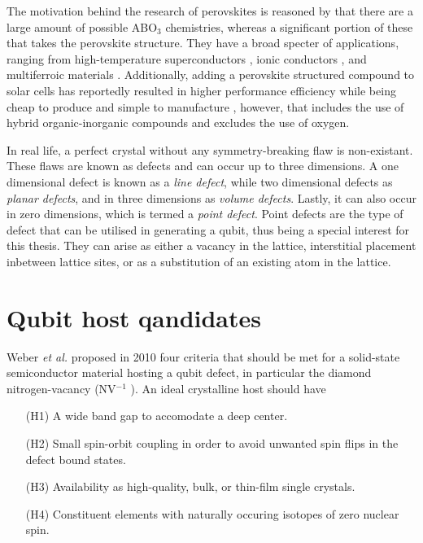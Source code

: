 The motivation behind the research of perovskites is reasoned by that there are a large amount of possible ABO$_3$ chemistries, whereas a significant portion of these that takes the perovskite structure. They have a broad specter of applications, ranging from high-temperature superconductors \cite{Bednorz1988}, ionic conductors \cite{Boivin1998}, and  multiferroic materials \cite{Cheong2007}. Additionally, adding a perovskite structured compound to solar cells has reportedly resulted in higher performance efficiency while being cheap to produce and simple to manufacture \cite{IbnMohammed2017, Chen2014}, however, that includes the use of hybrid organic-inorganic compounds and excludes the use of oxygen.

In real life, a perfect crystal without any symmetry-breaking flaw is non-existant. These flaws are known as defects and can occur up to three dimensions. A one dimensional defect is known as a \textit{line defect}, while two dimensional defects as \textit{planar defects}, and in three dimensions as \textit{volume defects}. Lastly, it can also occur in zero dimensions, which is termed a \textit{point defect}. Point defects are the type of defect that can be utilised in generating a qubit, thus being a special interest for this thesis. They can arise as either a vacancy in the lattice, interstitial placement inbetween lattice sites, or as a substitution of an existing atom in the lattice.

\clearpage


\section{Qubit host qandidates}


Weber \textit{et al.} \cite{Weber2010} proposed in 2010 four criteria that should be met for a solid-state semiconductor material hosting a qubit defect, in particular the diamond nitrogen-vacancy (NV$^{-1}$ ). An ideal crystalline host should have \cite{Weber2010}
\begin{itemize}
  \item[(H1)] A wide band gap to accomodate a deep center.
  \item[(H2)] Small spin-orbit coupling in order to avoid unwanted spin flips in the defect bound states.
  \item[(H3)] Availability as high-quality, bulk, or thin-film single crystals.
  \item[(H4)] Constituent elements with naturally occuring isotopes of zero nuclear spin.
\end{itemize}

